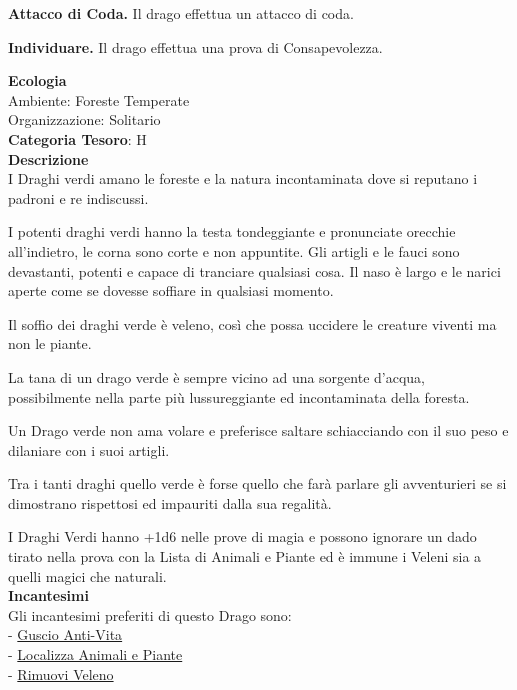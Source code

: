\begin{multicols}{2}
{\textbf{Attacco di Coda.} Il drago effettua un attacco di coda.

\textbf{Individuare.} Il drago effettua una prova di Consapevolezza.

\textbf{Ecologia}\\
Ambiente: Foreste Temperate\\
Organizzazione: Solitario\\
\textbf{Categoria Tesoro}: H\\
\textbf{Descrizione}\\
I Draghi verdi amano le foreste e la natura incontaminata dove si reputano i padroni e re indiscussi.

I potenti draghi verdi hanno la testa tondeggiante e pronunciate orecchie all'indietro, le corna sono corte e non appuntite.
Gli artigli e le fauci sono devastanti, potenti e capace di tranciare qualsiasi cosa.
Il naso è largo e le narici aperte come se dovesse soffiare in qualsiasi momento.

Il soffio dei draghi verde è veleno, così che possa uccidere le creature viventi ma non le piante.

La tana di un drago verde è sempre vicino ad una sorgente d'acqua, possibilmente nella parte più lussureggiante ed incontaminata della foresta.

Un Drago verde non ama volare e preferisce saltare schiacciando con il suo peso e dilaniare con i suoi artigli.

Tra i tanti draghi quello verde è forse quello che farà parlare gli avventurieri se si dimostrano rispettosi ed impauriti dalla sua regalità.

I Draghi Verdi hanno +1d6 nelle prove di magia e possono ignorare un dado tirato nella prova con la Lista di Animali e Piante ed è immune i Veleni sia a quelli magici che naturali.\\
\textbf{Incantesimi}\\
Gli incantesimi preferiti di questo Drago sono:\\
- \hyperlink{Guscio Anti-Vita}{Guscio Anti-Vita}\\
- \hyperlink{Localizza Animali e Piante}{Localizza Animali e Piante}\\
- \hyperlink{Rimuovi Veleno}{Rimuovi Veleno}

}
\end{multicols}
